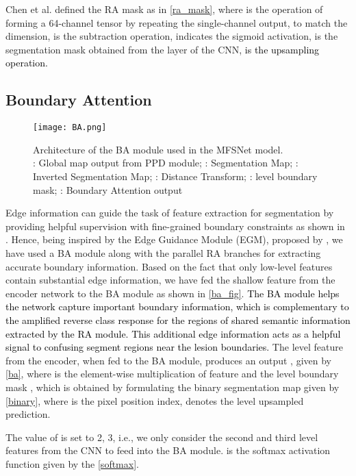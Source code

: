\documentclass[review]{elsarticle}
\begin{document}
Chen et al. \cite{chen2018reverse} defined the RA mask as in \autoref{ra_mask}, where  is the operation of forming a 64-channel tensor by repeating the single-channel output, to match the dimension,  is the subtraction operation,  indicates the sigmoid activation,  is the segmentation mask obtained from the  layer of the CNN, \textcolor{black}{ is the upsampling operation.}




\subsection{Boundary Attention}\label{boundary}

\begin{figure*}
    \centering
\texttt{[image: BA.png]}
\caption{Architecture of the BA module used in the MFSNet model.\\ : Global map output from PPD module; : Segmentation Map; : Inverted Segmentation Map; : Distance Transform; :  level boundary mask; : Boundary Attention output}
    \label{ba_fig}
\end{figure*}

Edge information can guide the task of feature extraction for segmentation by providing helpful supervision with fine-grained boundary constraints as shown in \cite{zhao2019egnet}. Hence, being inspired by the Edge Guidance Module (EGM), proposed by \cite{zhang2019net}, we have used a BA module along with the parallel RA branches for extracting accurate boundary information. Based on the fact that only low-level features contain substantial edge information, we have fed the shallow feature  from the encoder network to the BA module as shown in \autoref{ba_fig}. \textcolor{black}{The BA module helps the network capture important boundary information, which is complementary to the amplified reverse class response for the regions of shared semantic information extracted by the RA module. This additional edge information acts as a helpful signal to confusing segment regions near the lesion boundaries.} The  level feature  from the encoder, when fed to the BA module, produces an output , given by \autoref{ba}, where  is the element-wise multiplication of feature  and the  level boundary mask , which is obtained by formulating the binary segmentation map  given by \autoref{binary}, where  is the pixel position index,  denotes the  level upsampled prediction.





The value of  is set to 2, 3, i.e., we only consider the second and third level features from the CNN to feed into the BA module.  is the softmax activation function given by the \autoref{softmax}.
\end{document}
